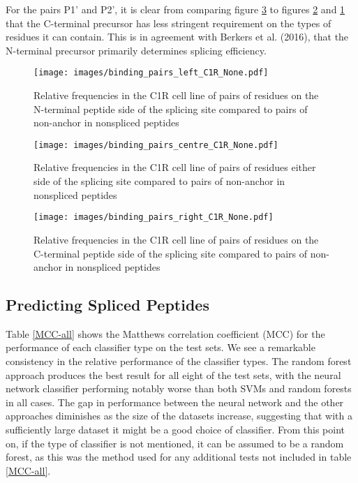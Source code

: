 \documentclass[10pt,a4paper,twoside,twocolumn]{article}
\begin{document}
For the pairs P1' and P2', it is clear from comparing figure \ref{C1R-right} to figures \ref{C1R-centre} and \ref{C1R-left} that the C-terminal precursor has less stringent requirement on the types of residues it can contain. This is in agreement with Berkers et al. (2016), that the N-terminal precursor primarily determines splicing efficiency.

	\begin{figure}
		\texttt{[image: images/binding\_pairs\_left\_C1R\_None.pdf]}
		\caption{Relative frequencies in the C1R cell line of pairs of residues on the N-terminal peptide side of the splicing site compared to pairs of non-anchor in nonspliced peptides}
		\label{C1R-left}
		
	\end{figure}
		\begin{figure}
			\texttt{[image: images/binding\_pairs\_centre\_C1R\_None.pdf]}
			\caption{Relative frequencies in the C1R cell line of pairs of residues either side of the splicing site compared to pairs of non-anchor in nonspliced peptides}
			\label{C1R-centre}
			
		\end{figure}
		\begin{figure}
			\texttt{[image: images/binding\_pairs\_right\_C1R\_None.pdf]}
			\caption{Relative frequencies in the C1R cell line of pairs of residues on the C-terminal peptide side of the splicing site compared to pairs of non-anchor in nonspliced peptides}
			\label{C1R-right}
			
		\end{figure}
 

\subsection*{Predicting Spliced Peptides}

Table \ref{MCC-all} shows the Matthews correlation coefficient (MCC) for the performance of each classifier type on the test sets. We see a remarkable consistency in the relative performance of the classifier types. The random forest approach produces the best result for all eight of the test sets, with the neural network classifier performing notably worse than both SVMs and random forests in all cases. The gap in performance between the neural network and the other approaches diminishes as the size of the datasets increase, suggesting that with a sufficiently large dataset it might be a good choice of classifier. From this point on, if the type of classifier is not mentioned, it can be assumed to be a random forest, as this was the method used for any additional tests not included in table \ref{MCC-all}.
\end{document}
